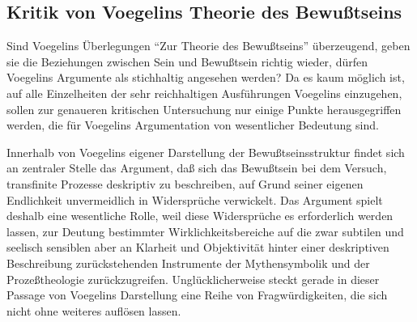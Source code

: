 \subsection{Kritik von Voegelins Theorie des Bewußtseins}

Sind Voegelins Überlegungen "`Zur Theorie des Bewußtseins"' überzeugend, geben
sie die Beziehungen zwischen Sein und Bewußtsein richtig wieder, dürfen
Voegelins Argumente als stichhaltig angesehen werden? Da es kaum möglich ist,
auf alle Einzelheiten der sehr reichhaltigen Ausführungen Voegelins
einzugehen, sollen zur genaueren kritischen Untersuchung nur einige Punkte
herausgegriffen werden, die für Voegelins Argumentation von wesentlicher
Bedeutung sind.

Innerhalb von Voegelins eigener Darstellung der Bewußtseinsstruktur findet
sich an zentraler Stelle das Argument, daß sich das Bewußtsein bei dem Versuch,
transfinite Prozesse deskriptiv zu beschreiben, auf Grund seiner eigenen
Endlichkeit unvermeidlich in Widersprüche verwickelt. Das Argument spielt
deshalb eine wesentliche Rolle, weil diese Widersprüche es erforderlich werden
lassen, zur Deutung bestimmter Wirklichkeitsbereiche auf die zwar subtilen und
seelisch sensiblen aber an Klarheit und Objektivität hinter einer deskriptiven
Beschreibung zurückstehenden Instrumente der Mythensymbolik und der
Prozeßtheologie zurückzugreifen. Unglücklicherweise steckt gerade in dieser
Passage von Voegelins Darstellung eine Reihe von Fragwürdigkeiten, die sich
nicht ohne weiteres auflösen lassen.

